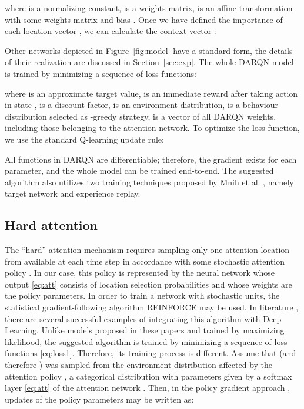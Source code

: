 \documentclass{article} \usepackage{nips15submit_e,times}
\begin{document}
where  is a normalizing constant,  is a weights matrix,  is an affine transformation with some weights matrix  and bias . 
Once we have defined the importance of each location vector , we can calculate the context vector :

Other networks depicted in Figure~\ref{fig:model} have a standard form, the details of their realization are discussed in Section~\ref{sec:exp}. 
The whole DARQN model is trained by minimizing a sequence of loss functions:

where  is an approximate target value,  is an immediate reward after taking action  in state ,  is a discount factor,  is an environment distribution,  is a behaviour distribution selected as -greedy strategy,  is a vector of all DARQN weights, including those belonging to the attention network. To optimize the loss function, we use the standard Q-learning update rule:

All functions in DARQN are differentiable; therefore, the gradient exists for each parameter, and the whole model can be trained end-to-end.  The suggested algorithm also utilizes two training techniques proposed by Mnih et al. \cite{mnih2015human}, namely target network and experience replay. \par


\subsection{Hard attention}

The ``hard'' attention mechanism requires sampling only one attention location from  available at each time step  in accordance with some
stochastic attention policy . 
In our case, this policy is represented by the neural network  whose output \eqref{eq:att} consists of location selection probabilities and whose weights are the policy parameters. 
In order to train a network with stochastic units, the statistical gradient-following algorithm REINFORCE \cite{williams1992simple} may be used. In literature \cite{ba2015attention, xu2015show}, there are several successful examples 
of integrating this algorithm with Deep Learning. Unlike models proposed in these papers and trained by maximizing likelihood, the suggested algorithm is trained by minimizing a sequence of loss functions \eqref{eq:loss1}. Therefore, its training process 
is different. Assume that  (and therefore ) was sampled from the environment distribution affected by 
the attention policy , a categorical distribution with parameters given by a softmax 
layer \eqref{eq:att} of the attention network . Then, in the policy gradient approach \cite{sutton2000policy}, updates 
of the policy parameters may be written as: 
\end{document}
